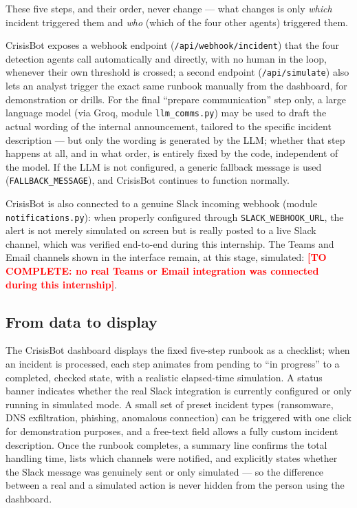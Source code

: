 \documentclass[12pt,a4paper]{report}
\newcommand{\TODO}[1]{\textcolor{red}{\textbf{[TO COMPLETE: #1]}}}
\newcommand{\code}[1]{\nolinkurl{#1}}
\begin{document}
These five steps, and their order, never change --- what changes is only \emph{which} incident triggered them and \emph{who} (which of the four other agents) triggered them.

CrisisBot exposes a webhook endpoint (\texttt{/api/webhook/incident}) that the four detection agents call automatically and directly, with no human in the loop, whenever their own threshold is crossed; a second endpoint (\texttt{/api/simulate}) also lets an analyst trigger the exact same runbook manually from the dashboard, for demonstration or drills. For the final ``prepare communication'' step only, a large language model (via Groq, module \texttt{llm\_comms.py}) may be used to draft the actual wording of the internal announcement, tailored to the specific incident description --- but only the wording is generated by the LLM; whether that step happens at all, and in what order, is entirely fixed by the code, independent of the model. If the LLM is not configured, a generic fallback message is used (\texttt{FALLBACK\_MESSAGE}), and CrisisBot continues to function normally.

\begin{sloppypar}
CrisisBot is also connected to a genuine Slack incoming webhook (module \code{notifications.py}): when properly configured through \code{SLACK_WEBHOOK_URL}, the alert is not merely simulated on screen but is really posted to a live Slack channel, which was verified end-to-end during this internship. The Teams and Email channels shown in the interface remain, at this stage, simulated: \TODO{no real Teams or Email integration was connected during this internship}.
\end{sloppypar}

\subsection*{From data to display}
The CrisisBot dashboard displays the fixed five-step runbook as a checklist; when an incident is processed, each step animates from pending to ``in progress'' to a completed, checked state, with a realistic elapsed-time simulation. A status banner indicates whether the real Slack integration is currently configured or only running in simulated mode. A small set of preset incident types (ransomware, DNS exfiltration, phishing, anomalous connection) can be triggered with one click for demonstration purposes, and a free-text field allows a fully custom incident description. Once the runbook completes, a summary line confirms the total handling time, lists which channels were notified, and explicitly states whether the Slack message was genuinely sent or only simulated --- so the difference between a real and a simulated action is never hidden from the person using the dashboard.
\end{document}
